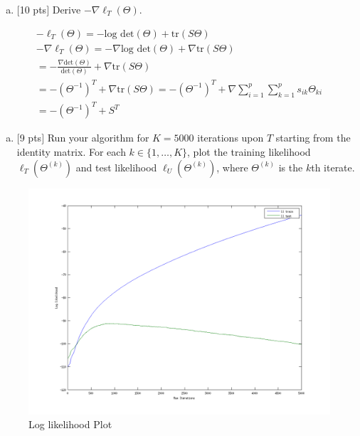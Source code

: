 \documentclass[12pt]{article}
\begin{document}
\begin{enumerate}[(a)]
\item $[$10 pts$]$ Derive $-\nabla\ell_T(\Theta)$.
\end{enumerate}

\begin{align*}
-\ell_T(\Theta) = -\textrm{log det}(\Theta) + \textrm{tr}(S\Theta) \\
-\nabla\ell_T(\Theta) = -\nabla \textrm{log det}(\Theta) + \nabla \textrm{tr}(S\Theta) \\
 = -\frac{\nabla \textrm{det}(\Theta)}{\textrm{det}(\Theta)} + \nabla \textrm{tr}(S\Theta)  \\
 = -(\Theta^{-1})^{T} + \nabla \textrm{tr}(S\Theta) 
 = -(\Theta^{-1})^{T} + \nabla \sum_{i=1}^{p} \sum_{k=1}^{p} {s_{ik}\Theta_{ki}} \\
 = -(\Theta^{-1})^{T} + S^T
\end{align*}

\vspace{.25cm}

\begin{enumerate}[(d)]
\item $[$9 pts$]$  Run your algorithm for $K = 5000$ iterations upon $T$ starting from the identity matrix. For each $k \in \{1,\ldots,K\}$, plot the training likelihood $\ell_T(\Theta^{(k)})$ and test likelihood $\ell_U(\Theta^{(k)})$, where $\Theta^{(k)}$ is the $k$th iterate.
\end{enumerate}

\begin{figure}[h!]
  \centering
    \includegraphics[width=\textwidth]{ll}
  \caption{Log likelihood Plot}
\end{figure}
\end{document}
